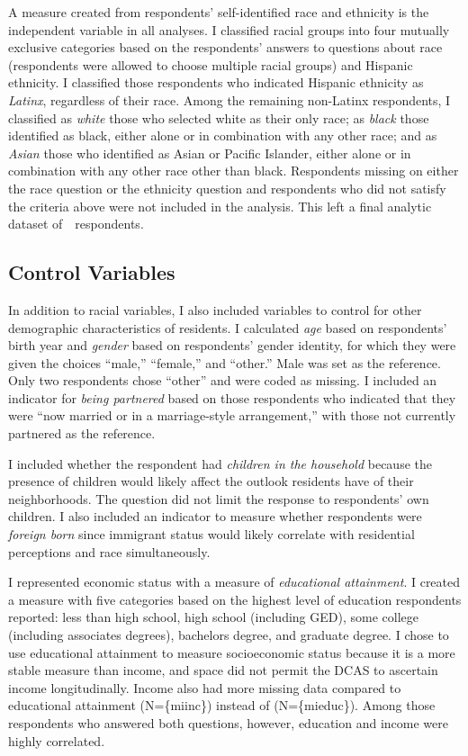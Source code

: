 \documentclass{baderart}
\begin{document}
A measure created from respondents' self-identified race and ethnicity is the independent variable in all analyses. I classified racial groups into four mutually exclusive categories based on the respondents' answers to questions about race (respondents were allowed to choose multiple racial groups) and Hispanic ethnicity. 
I classified those respondents who indicated Hispanic ethnicity as \emph{Latinx}, regardless of their race. Among the remaining non-Latinx respondents, I classified as \emph{white} those who selected white as their only race; as \emph{black} those identified as black, either alone or in combination with any other race; and as \emph{Asian} those who identified as Asian or Pacific Islander, either alone or in combination with any other race other than black. Respondents missing on either the race question or the ethnicity question and respondents who did not satisfy the criteria above were not included in the analysis. This left a final analytic dataset of~\N\ respondents.

\subsection{Control Variables}\label{control-variables}

In addition to racial variables, I also included variables to control for other demographic characteristics of residents. I calculated \emph{age} based on respondents' birth year and \emph{gender} based on respondents' gender identity, for which they were given the choices ``male,'' ``female,'' and ``other.'' Male was set as the reference. Only two respondents chose ``other'' and were coded as missing. I included an indicator for \emph{being partnered} based on those respondents who indicated that they were ``now married or in a marriage-style arrangement,'' with those not currently partnered as the reference.

I included whether the respondent had \emph{children in the household} because the presence of children would likely affect the outlook residents have of their neighborhoods. The question did not limit the response to respondents' own children. I also included an indicator to measure whether respondents were \emph{foreign born} since immigrant status would likely correlate with residential perceptions and race simultaneously.

I represented economic status with a measure of \emph{educational attainment}. I created a measure with five categories based on the highest level of education respondents reported: less than high school, high school (including GED), some college (including associates degrees), bachelors degree, and graduate degree. I chose to use educational attainment to measure socioeconomic status because it is a more stable measure than income, and space did not permit the DCAS to ascertain income longitudinally. Income also had more missing data compared to educational attainment (N=\{miinc\}) instead of (N=\{mieduc\}). Among those respondents who answered both questions, however, education and income were highly correlated.
\end{document}
